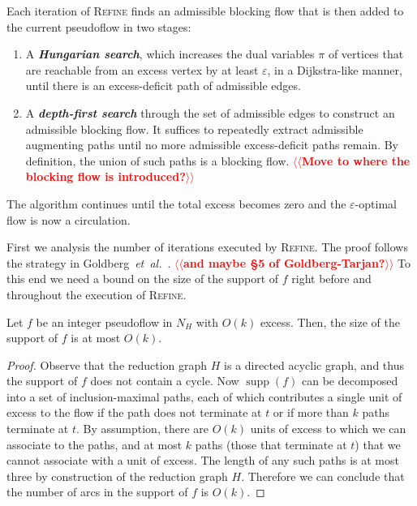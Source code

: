 \documentclass[a4paper,UKenglish]{socg-lipics-v2018}
\makeatletter
\def\note#1{\textcolor{red}{{#1}}}
\def\etal{\emph{et~al.}}
\def\etal{\textit{et~al.}}
\def\eps{\varepsilon}
\def\supp{\operatorname{supp}}
\theoremstyle{plain}
\numberwithin{figure}{section}
\def\EMPH#1{\textbf{\emph{\boldmath #1}}}
\def\n@te#1{\textsf{\boldmath \textbf{$\langle\!\langle$#1$\rangle\!\rangle$}}\leavevmode}
\def\note#1{\textcolor{red}{\n@te{#1}}}
\makeatother
\begin{document}
Each iteration of \textsc{Refine} finds an admissible blocking flow that is then added to the current pseudoflow in two stages:
\begin{enumerate}
\item
A \EMPH{Hungarian search}, which increases the dual variables $\pi$ of vertices that are reachable from an excess vertex by at least $\eps$, in a Dijkstra-like manner, until there is an excess-deficit path of admissible edges.
\item
A \EMPH{depth-first search} through the set of admissible edges to construct an admissible blocking flow.
It suffices to repeatedly extract admissible augmenting paths until no more admissible excess-deficit paths remain.
By definition, the union of such paths is a blocking flow. \note{Move to where the blocking flow is introduced?}
\end{enumerate}
The algorithm continues until the total excess becomes zero and the $\eps$-optimal flow is now a circulation.

First we analysis the number of iterations executed by \textsc{Refine}.
The proof follows the strategy in Goldberg~\etal~\cite[Section~3.2]{GHKT17}. \note{and maybe \S5 of Goldberg-Tarjan?}
%
%
To this end we need a bound on the size of the support of $f$ right before and throughout the execution of \textsc{Refine}.

\begin{lemmarep}
\label{lemma:reduction_count}
Let $f$ be an integer pseudoflow in $N_H$ with $O(k)$ excess.
Then, the size of the support of $f$ is at most $O(k)$.
\end{lemmarep}

\begin{proof}
Observe that the reduction graph $H$ is a directed acyclic graph, and thus the support of $f$ does not contain a cycle.
Now $\supp(f)$ can be decomposed into a set of inclusion-maximal paths,
each of which contributes a single unit of excess to the flow if the path does not terminate at $t$ or if more than $k$ paths terminate at $t$.
By assumption, there are $O(k)$ units of excess to which we can associate to the paths, and at most $k$ paths (those that terminate at $t$) that we cannot associate with a unit of excess.
The length of any such paths is at most  three by construction of the reduction graph $H$.
Therefore we can conclude that the number of arcs in the support of $f$ is $O(k)$.
\end{proof}
\end{document}
